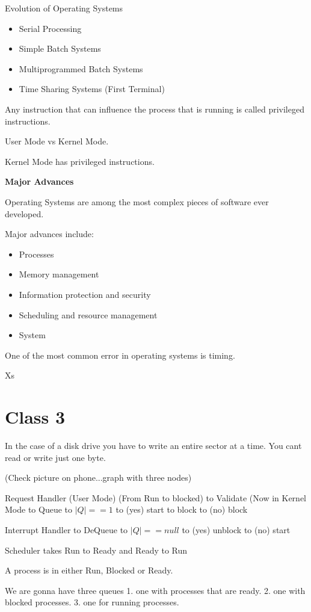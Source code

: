 \documentclass{article}
\begin{document}
Evolution of Operating Systems
\begin{itemize}
\item Serial Processing
\item Simple Batch Systems
\item Multiprogrammed Batch Systems
\item Time Sharing Systems (First Terminal)
\end{itemize}

Any instruction that can influence the process that is running is called privileged instructions.

User Mode vs Kernel Mode.

Kernel Mode has privileged instructions.

{\bf Major Advances}

Operating Systems are among the most complex pieces of software ever developed. 

Major advances include:
\begin{itemize}
\item Processes
\item Memory management
\item Information protection and security
\item Scheduling and resource management
\item System
\end{itemize}

One of the most common error in operating systems is timing. 

Xs

\section*{Class 3}

In the case of a disk drive you have to write an entire sector at a time.
You cant read or write just one byte. 

(Check picture on phone...graph with three nodes)

Request Handler (User Mode) (From Run to blocked)
  to Validate  (Now in Kernel Mode
  to Queue 
  to $|Q|==1$
    to (yes) start to block
    to (no) block

Interrupt Handler
  to DeQueue
  to $|Q|==null$
    to (yes) unblock
    to (no) start

Scheduler
  takes Run to Ready 
  and Ready to Run

A process is in either Run, Blocked or Ready. 

We are gonna have three queues
1. one with processes that are ready.
2. one with blocked processes.
3. one for running processes.
\end{document}
